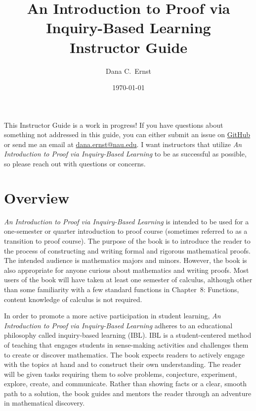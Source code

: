 \documentclass[11pt]{article}%
\newcommand{\blankline}{\pagebreak[2]\vspace{.5\baselineskip}}
\begin{document}
\title{An Introduction to Proof via Inquiry-Based Learning\\
Instructor Guide}
\author{Dana C.~Ernst}
\date{\today}

\maketitle

\begin{mdframed}[style=skeleton]
This Instructor Guide is a work in progress!  If you have questions about something not addressed in this guide, you can either submit an issue on \href{https://github.com/dcernst/IBL-IntroToProof/issues}{GitHub} or send me an email at \url{dana.ernst@nau.edu}.  I want instructors that utilize \emph{An Introduction to Proof via Inquiry-Based Learning} to be as successful as possible, so please reach out with questions or concerns.
\end{mdframed}

\section*{Overview}

\emph{An Introduction to Proof via Inquiry-Based Learning} is intended to be used for a one-semester or quarter introduction to proof course (sometimes referred to as a transition to proof course). The purpose of the book is to introduce the reader to the process of constructing and writing formal and rigorous mathematical proofs. The intended audience is mathematics majors and minors. However, the book is also appropriate for anyone curious about mathematics and writing proofs. Most users of the book will have taken at least one semester of calculus, although other than some familiarity with a few standard functions in Chapter~8: Functions, content knowledge of calculus is not required. 

\blankline

In order to promote a more active participation in student learning, \emph{An Introduction to Proof via Inquiry-Based Learning} adheres to an educational philosophy called inquiry-based learning (IBL). IBL is a student-centered method of teaching that engages students in sense-making activities and challenges them to create or discover mathematics.  The book expects readers to actively engage with the topics at hand and to construct their own understanding.  The reader will be given tasks requiring them to solve problems, conjecture, experiment, explore, create, and communicate.  Rather than showing facts or a clear, smooth path to a solution, the book guides and mentors the reader through an adventure in mathematical discovery. 
\end{document}
